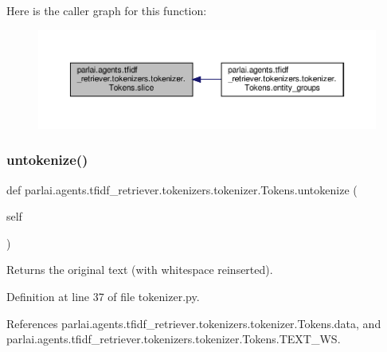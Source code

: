 Here is the caller graph for this function\+:
\nopagebreak
\begin{figure}[H]
\begin{center}
\leavevmode
\includegraphics[width=350pt]{classparlai_1_1agents_1_1tfidf__retriever_1_1tokenizers_1_1tokenizer_1_1Tokens_a8e68a443796116164126c7216f5963d3_icgraph}
\end{center}
\end{figure}
\mbox{\label{classparlai_1_1agents_1_1tfidf__retriever_1_1tokenizers_1_1tokenizer_1_1Tokens_a1bea40b1ea8e1772fb8ae6c2157ee819}} 
\subsubsection{\texorpdfstring{untokenize()}{untokenize()}}
{\footnotesize\ttfamily def parlai.\+agents.\+tfidf\+\_\+retriever.\+tokenizers.\+tokenizer.\+Tokens.\+untokenize (\begin{DoxyParamCaption}\item[{}]{self }\end{DoxyParamCaption})}

\begin{DoxyVerb}Returns the original text (with whitespace reinserted).\end{DoxyVerb}
 

Definition at line 37 of file tokenizer.\+py.



References parlai.\+agents.\+tfidf\+\_\+retriever.\+tokenizers.\+tokenizer.\+Tokens.\+data, and parlai.\+agents.\+tfidf\+\_\+retriever.\+tokenizers.\+tokenizer.\+Tokens.\+T\+E\+X\+T\+\_\+\+WS.



